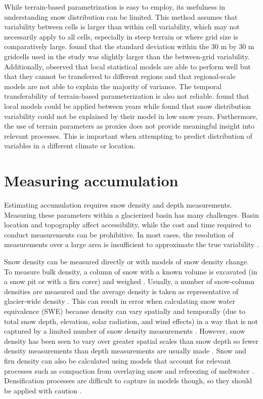 \documentclass{sfuthesis}
\begin{document}
While terrain-based parametrization is easy to employ, its usefulness in understanding snow distribution can be limited. This method assumes that variability between cells is larger than within cell variability, which may not necessarily apply to all cells, especially in steep terrain or where grid size is comparatively large. \cite{Marchand2005} found that the standard deviation within the 30 m by 30 m gridcells used in the study was slightly larger than the between-grid variability. Additionally, \cite{Grunewald2013} observed that local statistical models are able to perform well but that they cannot be transferred to different regions and that regional-scale models are not able to explain the majority of variance. The temporal transferability of terrain-based parameterization is also not reliable. \cite{Grunewald2013} found that local models could be applied between years while \cite{Revuelto2014} found that snow distribution variability could not be explained by their model in low snow years. Furthermore, the use of terrain parameters as proxies does not provide meaningful insight into relevant processes. This is important when attempting to predict distribution of variables in a different climate or location. 


\section{Measuring accumulation}
Estimating accumulation requires snow density and depth measurements. Measuring these parameters within a glacierized basin has many challenges. Basin location and topography affect accessibility, while the cost and time required to conduct measurements can be prohibitive. In most cases, the resolution of measurements over a large area is insufficient to approximate the true variability \citep{Bloeschl1999, Deems2006a}.

Snow density can be measured directly or with models of snow density change. To measure bulk density, a column of snow with a known volume is excavated (in a snow pit or with a firn corer) and weighed \citep{Sold2013, Sold2014}. Usually, a number of snow-column densities are measured and the average density is taken as representative of glacier-wide density \citep[e.g.][]{Machguth2006, Grunewald2010, McGrath2015}. This can result in error when calculating snow water equivalence (SWE) because density can vary spatially and temporally (due to total snow depth, elevation, solar radiation, and wind effects) in a way that is not captured by a limited number of snow density measurements \citep{Grunewald2010, Wetlaufer2016}. However, snow density has been seen to vary over greater spatial scales than snow depth so fewer density measurements than depth measurements are usually made \citep{Elder1998, Clark2011}. Snow and firn density can also be calculated using models that account for relevant processes such as compaction from overlaying snow and refreezing of meltwater \citep{Herron1980, Sold2014}. Densification processes are difficult to capture in models though, so they should be applied with caution \citep{Mellor1974}.
\end{document}
